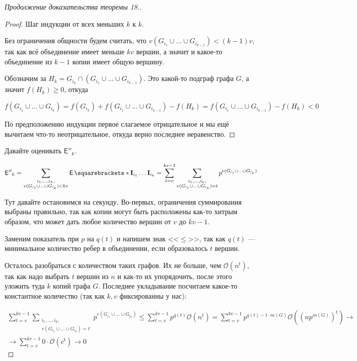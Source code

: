 \begin{proof}[Продолжение доказательства теоремы 18.]
\begin{proof}
    Шаг индукции от всех меньших $k$ к $k$.

    Без ограничения общности будем считать, что 
    $v(G_{i_1} \cup \ldots \cup G_{i_{k - 1}}) < (k - 1)v$, так как всё объединение
    имеет меньше $kv$ вершин, а значит и какое-то объединение из $k - 1$ копии
    имеет общую вершину.

    Обозначим за $H_k = G_{i_k} \cap (G_{i_1} \cup \ldots \cup G_{i_{k - 1}})$.
    Это какой-то подграф графа $G$, а значит $f(H_k) \geq 0$, откуда

    \[
      f(G_{i_1} \cup \ldots \cup G_{i_{k}}) = f(G_{i_k}) + f(G_{i_1} \cup \ldots \cup G_{i_{k - 1}})
      - f(H_k) = f(G_{i_1} \cup \ldots \cup G_{i_{k - 1}}) - f(H_k) < 0
    \]

    По предположению индукции первое слагаемое отрицательное и мы ещё вычитаем
    что-то неотрицательное, откуда верно последнее неравенство.
  \end{proof}

  Давайте оценивать $\mathsf{E''}_k$.

  \[
    \mathsf{E''}_k = \sum\limits_{\substack{i_1, \ldots, i_k,\\v(G_{i_1} \cup \ldots \cup G_{i_k}) < kv}}
    \E{\mathbf{I}_{i_1} \ldots \mathbf{I}_{i_k}} = \sum\limits_{t = v}^{kv - 1}
    \sum\limits_{\substack{i_1, \ldots, i_k,\\v(G_{i_1} \cup \ldots \cup G_{i_k}) = t}}
    p^{e(G_{i_1} \cup \ldots \cup G_{i_k})}
  \]

  Тут давайте остановимся на секунду. Во-первых, ограничения суммирования выбраны
  правильно, так как копии могут быть расположены как-то хитрым образом, что 
  может дать любое количество вершин от $v$ до $kv - 1$.

  Заменим показатель при $p$ на $q(t)$ и напишем знак <<$\leq$>>, так как $q(t)$
  --- минимальное количество ребер в объединении, если образовалось $t$ вершин.

  Осталось разобраться с количеством таких
  графов. Их не больше, чем $\mathcal{O}(n^t)$, так как надо выбрать $t$ вершин
  из $n$ и как-то их упорядочить, после этого уложить туда $k$ копий графа $G$.
  Последнее укладывание посчитаем какое-то константное количество (так как $k, v$
  фиксированны у нас):

  \begin{multline}
    \sum\limits_{t = v}^{kv - 1}
    \sum\limits_{\substack{i_1, \ldots, i_k,\\v(G_{i_1} \cup \ldots \cup G_{i_k}) = t}}
    p^{e(G_{i_1} \cup \ldots \cup G_{i_k})} \leq 
    \sum\limits_{t = v}^{kv - 1} p^{q(t)} \mathcal{O}(n^t) =
    \sum\limits_{t = v}^{kv - 1} p^{q(t) - t\cdot m(G)} \mathcal{O}\left(\left(np^{m(G)}\right)^t\right) \to\\\to
    \sum\limits_{t = v}^{kv - 1} 0 \cdot \mathcal{O}(c^t) \to 0
  \end{multline}


\end{proof}
